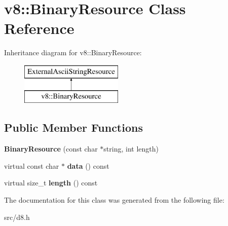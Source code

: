 \hypertarget{classv8_1_1_binary_resource}{}\section{v8\+:\+:Binary\+Resource Class Reference}
\label{classv8_1_1_binary_resource}
Inheritance diagram for v8\+:\+:Binary\+Resource\+:\begin{figure}[H]
\begin{center}
\leavevmode
\includegraphics[height=2.000000cm]{classv8_1_1_binary_resource}
\end{center}
\end{figure}
\subsection*{Public Member Functions}
\begin{DoxyCompactItemize}
\item 
\hypertarget{classv8_1_1_binary_resource_a67574a5abcc9965da77c8b6d5a283f25}{}{\bfseries Binary\+Resource} (const char $\ast$string, int length)\label{classv8_1_1_binary_resource_a67574a5abcc9965da77c8b6d5a283f25}

\item 
\hypertarget{classv8_1_1_binary_resource_a535d6d5178e5e206404b20c1aeec9987}{}virtual const char $\ast$ {\bfseries data} () const \label{classv8_1_1_binary_resource_a535d6d5178e5e206404b20c1aeec9987}

\item 
\hypertarget{classv8_1_1_binary_resource_af2d43aff7b1e0ed40e632f062ee4526b}{}virtual size\+\_\+t {\bfseries length} () const \label{classv8_1_1_binary_resource_af2d43aff7b1e0ed40e632f062ee4526b}

\end{DoxyCompactItemize}


The documentation for this class was generated from the following file\+:\begin{DoxyCompactItemize}
\item 
src/d8.\+h\end{DoxyCompactItemize}
